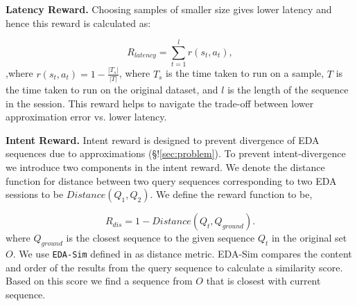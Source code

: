 \noindent\textbf{Latency Reward. }
Choosing samples of smaller size gives lower latency and hence this reward is calculated as:

{\small
\begin{equation}
\label{latency_reward}
    R_{latency} = \sum_{t=1}^{l} r(s_t, a_t),
\end{equation}
}
,where $r(s_t, a_t) = 1 - \frac{|{T_s}|}{|T|}$, where $T_s$ is the time taken to run on a sample, $T$ is the time taken to run on the original dataset, and $l$ is the length of the sequence in the session. 
This reward helps to navigate the trade-off between lower approximation error vs. lower latency. 

\noindent\textbf{Intent Reward. }
Intent reward is designed to prevent divergence of EDA sequences due to approximations (\S!\ref{sec:problem}). 
To prevent intent-divergence we introduce two components in the intent reward. We denote the distance function for distance between two query sequences corresponding to two EDA sessions to be $Distance(Q_1, Q_2)$. We define the reward function to be,

{\small
\begin{equation}
\label{eq_eda_sim}
    R_{dis} = 1 - Distance(Q_t, Q_{ground}).
\end{equation}
}
where $Q_{ground}$ is the closest sequence to the given sequence $Q_{t}$ in the original set $O$.
 We use \texttt{EDA-Sim} defined in \cite{atena2020sigmod} as distance metric. EDA-Sim compares the content and order of the results from the query sequence to calculate a similarity score. Based on this score we find a sequence from $O$ that is closest with current sequence.

